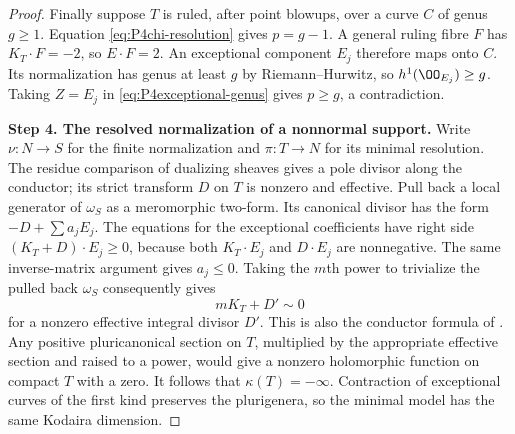 \begin{proof}
Finally suppose $T$ is ruled, after point blowups, over a curve
$C$ of genus $g\ge1$. Equation \eqref{eq:P4chi-resolution}
gives $p=g-1$. A general ruling fibre $F$ has $K_T\cdot F=-2$,
so $E\cdot F=2$. An exceptional component $E_j$ therefore
maps onto $C$. Its normalization has genus at least $g$ by
Riemann--Hurwitz, so $h^1(\OO_{E_j})\ge g$. Taking $Z=E_j$
in \eqref{eq:P4exceptional-genus} gives $p\ge g$, a contradiction.

\noindent\textbf{Step 4. The resolved normalization of a nonnormal support.}
Write $\nu:N\to S$ for the finite normalization and $\pi:T\to N$
for its minimal resolution. The residue comparison of dualizing
sheaves gives a pole divisor along the conductor; its strict
transform $D$ on $T$ is nonzero and effective. Pull back a local generator of $\omega_S$ as a meromorphic
two-form. Its canonical divisor has the form $-D+\sum a_jE_j$.
The equations for the exceptional coefficients have right side
$(K_T+D)\cdot E_j\ge0$, because both $K_T\cdot E_j$ and
$D\cdot E_j$ are nonnegative. The same inverse-matrix argument
gives $a_j\le0$. Taking the $m$th power to trivialize the pulled
back $\omega_S$ consequently gives
\[
 mK_T+D'\sim0
\]
for a nonzero effective integral divisor $D'$. This is also the
conductor formula of \cite[Lemma~4.6, p.~7 of the attached-source edition]{CDP20}. Any
positive pluricanonical section on $T$, multiplied by the
appropriate effective section and raised to a power, would give
a nonzero holomorphic function on compact $T$ with a zero.
It follows that $\kappa(T)=-\infty$. Contraction of exceptional
curves of the first kind preserves the plurigenera, so the minimal
model has the same Kodaira dimension.

\end{proof}